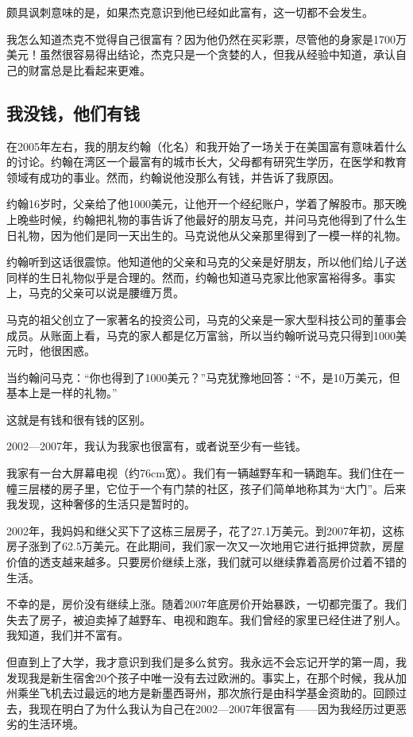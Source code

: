 颇具讽刺意味的是，如果杰克意识到他已经如此富有，这一切都不会发生。

我怎么知道杰克不觉得自己很富有？因为他仍然在买彩票，尽管他的身家是1700万美元！虽然很容易得出结论，杰克只是一个贪婪的人，但我从经验中知道，承认自己的财富总是比看起来更难。

\subsection{我没钱，他们有钱}

在2005年左右，我的朋友约翰（化名）和我开始了一场关于在美国富有意味着什么的讨论。约翰在湾区一个最富有的城市长大，父母都有研究生学历，在医学和教育领域有成功的事业。然而，约翰说他没那么有钱，并告诉了我原因。

约翰16岁时，父亲给了他1000美元，让他开一个经纪账户，学着了解股市。那天晚上晚些时候，约翰把礼物的事告诉了他最好的朋友马克，并问马克他得到了什么生日礼物，因为他们是同一天出生的。马克说他从父亲那里得到了一模一样的礼物。

约翰听到这话很震惊。他知道他的父亲和马克的父亲是好朋友，所以他们给儿子送同样的生日礼物似乎是合理的。然而，约翰也知道马克家比他家富裕得多。事实上，马克的父亲可以说是腰缠万贯。

马克的祖父创立了一家著名的投资公司，马克的父亲是一家大型科技公司的董事会成员。从账面上看，马克的家人都是亿万富翁，所以当约翰听说马克只得到1000美元时，他很困惑。

当约翰问马克：“你也得到了1000美元？”马克犹豫地回答：“不，是10万美元，但基本上是一样的礼物。”

这就是有钱和很有钱的区别。

2002—2007年，我认为我家也很富有，或者说至少有一些钱。

我家有一台大屏幕电视（约76cm宽）。我们有一辆越野车和一辆跑车。我们住在一幢三层楼的房子里，它位于一个有门禁的社区，孩子们简单地称其为“大门”。后来我发现，这种奢侈的生活只是暂时的。

2002年，我妈妈和继父买下了这栋三层房子，花了27.1万美元。到2007年初，这栋房子涨到了62.5万美元。在此期间，我们家一次又一次地用它进行抵押贷款，房屋价值的透支越来越多。只要房价继续上涨，我们就可以继续靠着高房价过着不错的生活。

不幸的是，房价没有继续上涨。随着2007年底房价开始暴跌，一切都完蛋了。我们失去了房子，被迫卖掉了越野车、电视和跑车。我们曾经的家里已经住进了别人。我知道，我们并不富有。

但直到上了大学，我才意识到我们是多么贫穷。我永远不会忘记开学的第一周，我发现我是新生宿舍20个孩子中唯一没有去过欧洲的。事实上，在那个时候，我从加州乘坐飞机去过最远的地方是新墨西哥州，那次旅行是由科学基金资助的。回顾过去，我现在明白了为什么我认为自己在2002—2007年很富有——因为我经历过更恶劣的生活环境。

